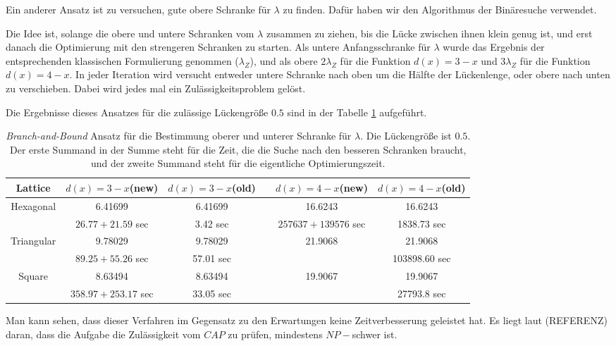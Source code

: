 \documentclass[
	fontsize=12pt,
	paper=a4,
	twoside=false,
	numbers=noenddot,
	plainheadsepline,
	toc=listof,
	toc=bibliography
]{scrartcl}
\begin{document}
\begin{itemize}
	Ein anderer Ansatz ist zu versuchen, gute obere Schranke für $\lambda$ zu finden. Dafür haben wir den Algorithmus der Binäresuche verwendet.
	
	Die Idee ist, solange die obere und untere Schranken vom $\lambda$ zusammen zu ziehen, bis die Lücke zwischen ihnen klein genug ist, und erst danach die Optimierung mit den strengeren Schranken zu starten.
	Als untere Anfangsschranke für $\lambda$ wurde das Ergebnis der entsprechenden klassischen Formulierung genommen ($\lambda_Z$), und als obere $2\lambda_Z$ für die Funktion $d(x)=3-x$ und $3\lambda_Z$ für die Funktion $d(x)=4-x$. In jeder Iteration wird versucht entweder untere Schranke nach oben um die Hälfte der Lückenlenge, oder obere nach unten zu verschieben. Dabei wird jedes mal ein Zulässigkeitsproblem gelöst. 
	
	Die Ergebnisse dieses Ansatzes für die zulässige Lückengröße $0.5$ sind in der Tabelle \ref{Table:BB} aufgeführt.
	
	\begin{table}[htbp]
	\centering
	\begin{tabular}{|c|c|c|c|c|c|}
	\hline Lattice& $d(x)=3-x$(new)  & $d(x)=3-x$(old) && $d(x)=4-x$(new)  & $d(x)=4-x$(old)\\ \hline 
		Hexagonal	&  6.41699	& 6.41699 && 16.6243 & 16.6243 \\ 
			& $26.77+21.59$ sec	& 3.42 sec && $257637+139576$ sec & 1838.73 sec \\ \hline
		Triangular	& 9.78029	&  9.78029 && 21.9068 & 21.9068 \\
			& $89.25+55.26$ sec	& 57.01 sec && & 103898.60 sec \\ \hline
		Square	& 8.63494	&   8.63494 &&  19.9067 & 19.9067\\
			& $358.97+253.17$ sec & 33.05 sec &&  & 27793.8 sec \\
	\hline
	\end{tabular}
	\caption{ {\it Branch-and-Bound} Ansatz für die Bestimmung oberer und unterer Schranke für $\lambda$. Die Lückengröße ist $0.5$. Der erste Summand in der Summe steht für die Zeit, die die Suche nach den besseren Schranken braucht, und der zweite Summand steht für die eigentliche Optimierungszeit.} 
	\label{Table:BB}
	\end{table}
	
	Man kann sehen, dass dieser Verfahren im Gegensatz zu den Erwartungen keine Zeitverbesserung geleistet hat. Es liegt laut (REFERENZ) daran, dass die Aufgabe die Zulässigkeit vom $CAP$ zu prüfen, mindestens $NP-$schwer ist.
	

\end{itemize}
\end{document}
